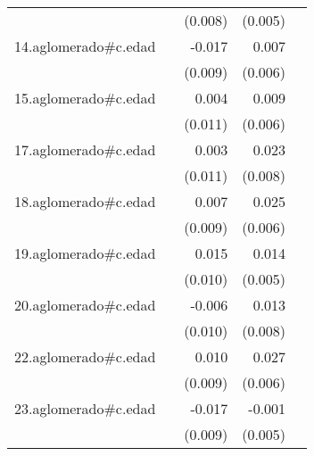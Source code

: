 {\begin{longtable}{l*{4}{D{.}{.}{-1}}}
            &                     &     (0.008)         &     (0.005)         &                     \\
\addlinespace
14.aglomerado#c.edad&                     &      -0.017         &       0.007         &                     \\
            &                     &     (0.009)         &     (0.006)         &                     \\
\addlinespace
15.aglomerado#c.edad&                     &       0.004         &       0.009         &                     \\
            &                     &     (0.011)         &     (0.006)         &                     \\
\addlinespace
17.aglomerado#c.edad&                     &       0.003         &       0.023\sym{**} &                     \\
            &                     &     (0.011)         &     (0.008)         &                     \\
\addlinespace
18.aglomerado#c.edad&                     &       0.007         &       0.025\sym{***}&                     \\
            &                     &     (0.009)         &     (0.006)         &                     \\
\addlinespace
19.aglomerado#c.edad&                     &       0.015         &       0.014\sym{**} &                     \\
            &                     &     (0.010)         &     (0.005)         &                     \\
\addlinespace
20.aglomerado#c.edad&                     &      -0.006         &       0.013         &                     \\
            &                     &     (0.010)         &     (0.008)         &                     \\
\addlinespace
22.aglomerado#c.edad&                     &       0.010         &       0.027\sym{***}&                     \\
            &                     &     (0.009)         &     (0.006)         &                     \\
\addlinespace
23.aglomerado#c.edad&                     &      -0.017         &      -0.001         &                     \\
            &                     &     (0.009)         &     (0.005)         &                     \\

\end{longtable}}
